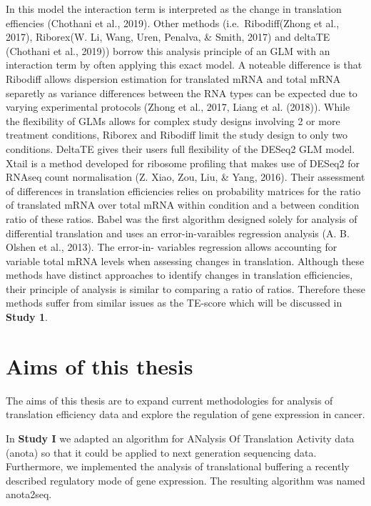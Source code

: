 \documentclass[12pt,openany]{book}
\begin{document}
In this model the interaction term is interpreted as the change in
translation effiencies (Chothani et al., 2019). Other methods
(i.e.~Ribodiff(Zhong et al., 2017), Riborex(W. Li, Wang, Uren, Penalva,
\& Smith, 2017) and deltaTE (Chothani et al., 2019)) borrow this
analysis principle of an GLM with an interaction term by often applying
this exact model. A noteable difference is that Ribodiff allows
dispersion estimation for translated mRNA and total mRNA separetly as
variance differences between the RNA types can be expected due to
varying experimental protocols (Zhong et al., 2017, Liang et al.
(2018)). While the flexibility of GLMs allows for complex study designs
involving 2 or more treatment conditions, Riborex and Ribodiff limit the
study design to only two conditions. DeltaTE gives their users full
flexibility of the DESeq2 GLM model. Xtail is a method developed for
ribosome profiling that makes use of DESeq2 for RNAseq count
normalisation (Z. Xiao, Zou, Liu, \& Yang, 2016). Their assessment of
differences in translation efficiencies relies on probability matrices
for the ratio of translated mRNA over total mRNA within condition and a
between condition ratio of these ratios. Babel was the first algorithm
designed solely for analysis of differential translation and uses an
error-in-varaibles regression analysis (A. B. Olshen et al., 2013). The
error-in- variables regression allows accounting for variable total mRNA
levels when assessing changes in translation. Although these methods
have distinct approaches to identify changes in translation
efficiencies, their principle of analysis is similar to comparing a
ratio of ratios. Therefore these methods suffer from similar issues as
the TE-score which will be discussed in \textbf{Study 1}.

\chapter{Aims of this thesis}

The aims of this thesis are to expand current methodologies for analysis
of translation efficiency data and explore the regulation of gene
expression in cancer.

In \textbf{Study I} we adapted an algorithm for ANalysis Of Translation
Activity data (anota) so that it could be applied to next generation
sequencing data. Furthermore, we implemented the analysis of
translational buffering a recently described regulatory mode of gene
expression. The resulting algorithm was named anota2seq.
\end{document}
